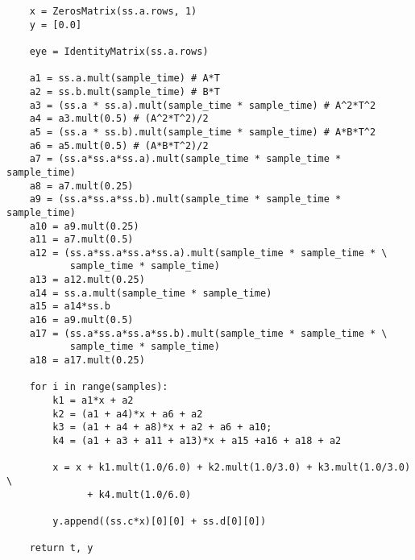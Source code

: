 \begin{verbatim}
    x = ZerosMatrix(ss.a.rows, 1)
    y = [0.0]
    
    eye = IdentityMatrix(ss.a.rows)
    
    a1 = ss.a.mult(sample_time) # A*T
    a2 = ss.b.mult(sample_time) # B*T
    a3 = (ss.a * ss.a).mult(sample_time * sample_time) # A^2*T^2
    a4 = a3.mult(0.5) # (A^2*T^2)/2
    a5 = (ss.a * ss.b).mult(sample_time * sample_time) # A*B*T^2
    a6 = a5.mult(0.5) # (A*B*T^2)/2
    a7 = (ss.a*ss.a*ss.a).mult(sample_time * sample_time * sample_time)
    a8 = a7.mult(0.25)
    a9 = (ss.a*ss.a*ss.b).mult(sample_time * sample_time * sample_time)
    a10 = a9.mult(0.25)
    a11 = a7.mult(0.5)
    a12 = (ss.a*ss.a*ss.a*ss.a).mult(sample_time * sample_time * \
           sample_time * sample_time)
    a13 = a12.mult(0.25)
    a14 = ss.a.mult(sample_time * sample_time)
    a15 = a14*ss.b
    a16 = a9.mult(0.5)
    a17 = (ss.a*ss.a*ss.a*ss.b).mult(sample_time * sample_time * \
           sample_time * sample_time)
    a18 = a17.mult(0.25)
    
    for i in range(samples):
        k1 = a1*x + a2
        k2 = (a1 + a4)*x + a6 + a2
        k3 = (a1 + a4 + a8)*x + a2 + a6 + a10;
        k4 = (a1 + a3 + a11 + a13)*x + a15 +a16 + a18 + a2
        
        x = x + k1.mult(1.0/6.0) + k2.mult(1.0/3.0) + k3.mult(1.0/3.0) \
              + k4.mult(1.0/6.0)
        
        y.append((ss.c*x)[0][0] + ss.d[0][0])

    return t, y\end{verbatim}
    \normalsize
